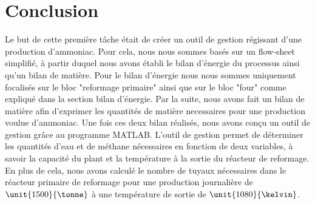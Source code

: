 \section{Conclusion}
Le but de cette première tâche était de créer un outil de gestion régissant d'une production d'ammoniac. 
Pour cela, nous nous sommes basés sur un flow-sheet simplifié, à partir duquel nous avons établi le bilan d'énergie du processus
ainsi qu'un bilan de matière. Pour le bilan d'énergie nous nous sommes uniquement focalisés sur le bloc "reformage primaire" ainsi
que sur le bloc "four" comme expliqué dans la section bilan d'énergie. Par la suite, nous avons fait un bilan de matière 
afin d'exprimer les quantités de matière necessaires pour une production voulue d'ammoniac. Une fois ces deux bilan 
réalisés, nous avons conçu un outil de gestion grâce au programme \textsc{MATLAB}. L'outil de gestion permet de déterminer les 
quantités d'eau et de méthane nécessaires en fonction de deux variables, à savoir la capacité du plant et la température à 
la sortie du réacteur de reformage. En plus de cela, nous avons calculé le nombre de tuyaux nécessaires dans le réacteur
primaire de reformage pour une production journalière de $\unit{1500}{\tonne}$ à une température de sortie de 
$\unit{1080}{\kelvin}$.
